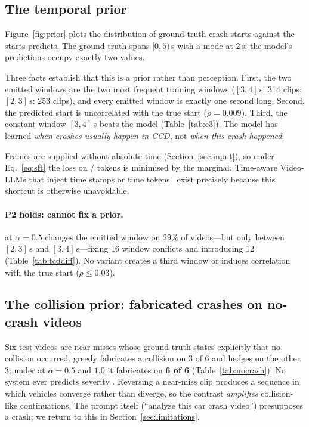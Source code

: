 \subsection{The temporal prior}
\label{sec:prior}

Figure~\ref{fig:prior} plots the distribution of ground-truth crash starts against the starts \crashlogic{} predicts.
The ground truth spans $[0,5)$\,s with a mode at $2$\,s; the model's predictions occupy exactly two values.



Three facts establish that this is a prior rather than perception.
First, the two emitted windows are the two most frequent training windows ($[3,4]$\,s: 314 clips; $[2,3]$\,s: 253 clips), and every emitted window is exactly one second long.
Second, the predicted start is uncorrelated with the true start ($\rho{=}0.009$).
Third, the constant window $[3,4]$\,s beats the model (Table~\ref{tab:e3}).
The model has learned \emph{when crashes usually happen in CCD}, not \emph{when this crash happened}.

Frames are supplied without absolute time (Section~\ref{sec:input}), so under Eq.~\eqref{eq:sft} the loss on / tokens is minimised by the marginal.
Time-aware Video-LLMs that inject time stamps or time tokens~\cite{timechat,vtimellm,lita} exist precisely because this shortcut is otherwise unavoidable.

\paragraph{P2 holds: \tcd{} cannot fix a prior.}
\tcd{} at $\alpha{=}0.5$ changes the emitted window on $29\%$ of videos---but only between $[2,3]$\,s and $[3,4]$\,s---fixing 16 window conflicts and introducing 12 (Table~\ref{tab:tcddiff}).
No variant creates a third window or induces correlation with the true start ($\rho\leq0.03$).

\subsection{The collision prior: fabricated crashes on no-crash videos}
\label{sec:nocrash}

Six test videos are near-misses whose ground truth states explicitly that no collision occurred.
\crashlogic{} greedy fabricates a collision on 3 of 6 and hedges on the other 3; under \tcd{} at $\alpha{=}0.5$ and $1.0$ it fabricates on \textbf{6 of 6} (Table~\ref{tab:nocrash}).
No system ever predicts severity .
Reversing a near-miss clip produces a sequence in which vehicles converge rather than diverge, so the contrast \emph{amplifies} collision-like continuations.
The prompt itself (``analyze this car crash video'') presupposes a crash; we return to this in Section~\ref{sec:limitations}.

